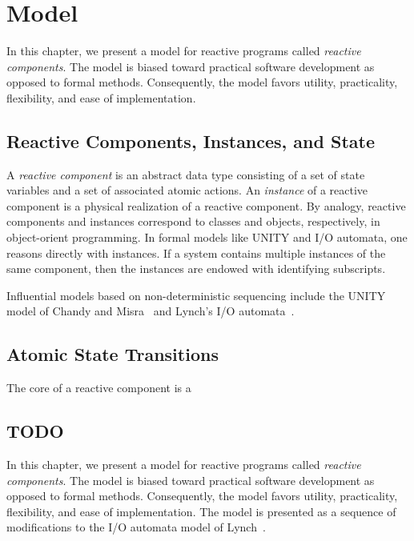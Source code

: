 \chapter{Model \label{model}}

In this chapter, we present a model for reactive programs called \emph{reactive components}.
The model is biased toward practical software development as opposed to formal methods.
Consequently, the model favors utility, practicality, flexibility, and ease of implementation.

\section{Reactive Components, Instances, and State}

A \emph{reactive component} is an abstract data type consisting of a set of state variables and a set of associated atomic actions.
An \emph{instance} of a reactive component is a physical realization of a reactive component.
By analogy, reactive components and instances correspond to classes and objects, respectively, in object-orient programming.
In formal models like UNITY and I/O automata, one reasons directly with instances.
If a system contains multiple instances of the same component, then the instances are endowed with identifying subscripts.




Influential models based on non-deterministic sequencing include the UNITY model of Chandy and Misra~\cite{chandy1989parallel} and Lynch's I/O automata~\cite{nancy1996distributed}.



\section{Atomic State Transitions}

The core of a reactive component is a



\section{TODO}

In this chapter, we present a model for reactive programs called \emph{reactive components}.
The model is biased toward practical software development as opposed to formal methods.
Consequently, the model favors utility, practicality, flexibility, and ease of implementation.
The model is presented as a sequence of modifications to the I/O automata model of Lynch~\cite{nancy1996distributed}.


